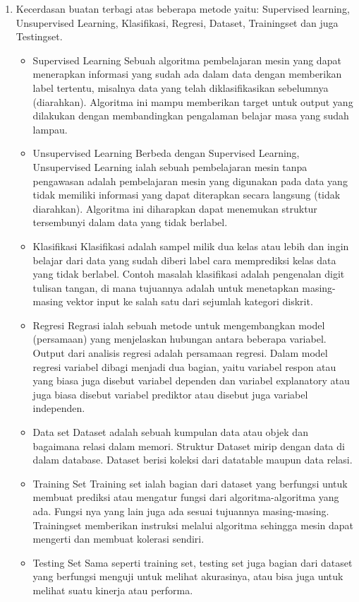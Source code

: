 \begin{enumerate}
	\item Kecerdasan buatan terbagi atas beberapa metode yaitu:
	\hfill\break
	Supervised learning, Unsupervised Learning, Klasifikasi, Regresi, Dataset, Trainingset dan juga Testingset.
	\begin{itemize}
		\item Supervised Learning
		\hfill\break
		Sebuah algoritma pembelajaran mesin yang dapat menerapkan informasi yang sudah ada dalam data dengan memberikan label tertentu, misalnya data yang telah diklasifikasikan sebelumnya (diarahkan). Algoritma ini mampu memberikan target untuk output yang dilakukan dengan membandingkan pengalaman belajar masa yang sudah lampau.
		\item Unsupervised Learning 
		\hfill\break
		Berbeda dengan Supervised Learning, Unsupervised Learning ialah sebuah pembelajaran mesin tanpa pengawasan adalah pembelajaran mesin yang digunakan pada data yang tidak memiliki informasi yang dapat diterapkan secara langsung (tidak diarahkan). Algoritma ini diharapkan dapat menemukan struktur tersembunyi dalam data yang tidak berlabel.
		\item Klasifikasi
		\hfill\break
		Klasifikasi adalah sampel milik dua kelas atau lebih dan ingin belajar dari data yang sudah diberi label cara memprediksi kelas data yang tidak berlabel. Contoh masalah klasifikasi adalah pengenalan digit tulisan tangan, di mana tujuannya adalah untuk menetapkan masing-masing vektor input ke salah satu dari sejumlah kategori diskrit. 
		\item Regresi
		\hfill\break
		Regrasi ialah sebuah metode untuk mengembangkan model (persamaan) yang menjelaskan hubungan antara beberapa variabel. Output dari analisis regresi adalah persamaan regresi. Dalam model regresi variabel dibagi menjadi dua bagian, yaitu variabel respon atau yang biasa juga disebut variabel dependen dan variabel explanatory atau juga biasa disebut variabel prediktor atau disebut juga variabel independen.
		\item Data set
		\hfill\break
		Dataset adalah sebuah kumpulan data atau objek dan bagaimana relasi dalam memori. Struktur Dataset mirip dengan data di dalam database. Dataset berisi koleksi dari datatable maupun data relasi.
		\item Training Set
		\hfill\break
		Training set ialah bagian dari dataset yang berfungsi untuk membuat prediksi atau mengatur fungsi dari algoritma-algoritma yang ada. Fungsi nya yang lain juga ada sesuai tujuannya masing-masing. Trainingset memberikan instruksi melalui algoritma sehingga mesin dapat mengerti dan membuat kolerasi sendiri.		
		\item Testing Set
		\hfill\break
		Sama seperti training set, testing set juga bagian dari dataset yang berfungsi menguji untuk melihat akurasinya, atau bisa juga untuk melihat suatu kinerja atau performa.
	\end{itemize}
\end{enumerate}
